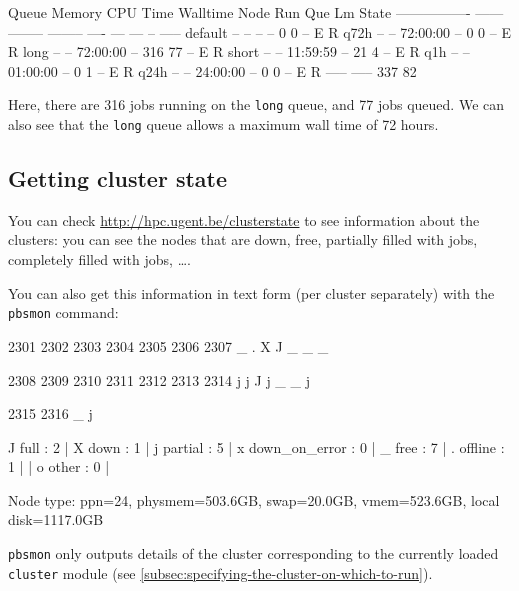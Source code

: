 \begin{prompt}
Queue            Memory CPU Time Walltime Node  Run Que Lm  State
---------------- ------ -------- -------- ----  --- --- --  -----
default            --      --       --      --    0   0 --   E R
q72h               --      --    72:00:00   --    0   0 --   E R
long               --      --    72:00:00   --  316  77 --   E R
short              --      --    11:59:59   --   21   4 --   E R
q1h                --      --    01:00:00   --    0   1 --   E R
q24h               --      --    24:00:00   --    0   0 --   E R
                                               ----- -----
                                                337  82
\end{prompt}

Here, there are 316 jobs running on the \lstinline|long| queue, and 77 jobs queued. We
can also see that the \lstinline|long| queue allows a maximum wall time of 72 hours.
\fi  %

\ifgent
\subsection{Getting cluster state}

You can check \url{http://hpc.ugent.be/clusterstate} to see information about
the clusters: you can see the nodes that are down, free, partially filled with jobs,
completely filled with jobs, \ldots.

You can also get this information in text form (per cluster separately) with
the \lstinline|pbsmon| command:


\begin{prompt}
2301 2302 2303 2304 2305 2306 2307
    _    .    X    J    _    _    _

 2308 2309 2310 2311 2312 2313 2314
    j    j    J    j    _    _    j

 2315 2316
    _    j

   J full                 : 2   |   X down                 : 1   |
   j partial              : 5   |   x down_on_error        : 0   |
   _ free                 : 7   |   . offline              : 1   |
                                |   o other                : 0   |

Node type:
 ppn=24, physmem=503.6GB, swap=20.0GB, vmem=523.6GB, local disk=1117.0GB
\end{prompt}

\lstinline|pbsmon| only outputs details of the cluster corresponding to the
currently loaded \lstinline|cluster| module (see \autoref{subsec:specifying-the-cluster-on-which-to-run}).

